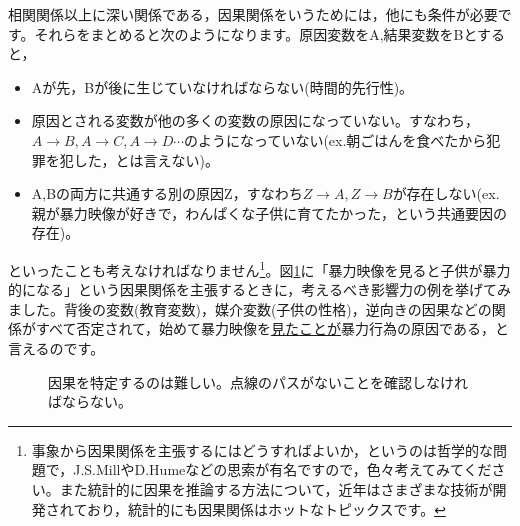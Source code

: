 \documentclass{ltjbook}
\begin{document}
相関関係以上に深い関係である，因果関係をいうためには，他にも条件が必要です。それらをまとめると次のようになります。原因変数をA,結果変数をBとすると，
\begin{itemize}
	\item Aが先，Bが後に生じていなければならない(時間的先行性)。
	\item 原因とされる変数が他の多くの変数の原因になっていない。すなわち，$A \to B, A \to C, A \to D \cdots$のようになっていない(ex.朝ごはんを食べたから犯罪を犯した，とは言えない)。
	\item A,Bの両方に共通する別の原因Z，すなわち$Z \to A, Z \to B$が存在しない(ex.親が暴力映像が好きで，わんぱくな子供に育てたかった，という共通要因の存在)。
\end{itemize}
といったことも考えなければなりません\footnote{事象から因果関係を主張するにはどうすればよいか，というのは哲学的な問題で，J.S.MillやD.Humeなどの思索が有名ですので，色々考えてみてください。また統計的に因果を推論する方法について，近年はさまざまな技術が開発されており，統計的にも因果関係はホットなトピックスです。}。図\ref{fig:m08_causal}に「暴力映像を見ると子供が暴力的になる」という因果関係を主張するときに，考えるべき影響力の例を挙げてみました。背後の変数(教育変数)，媒介変数(子供の性格)，逆向きの因果などの関係がすべて否定されて，始めて暴力映像を\underline{見たことが}暴力行為の原因である，と言えるのです。

\begin{figure}[ht]
	\centering
	\caption{因果を特定するのは難しい。点線のパスがないことを確認しなければならない。}
	\label{fig:m08_causal}
\end{figure}
\end{document}
